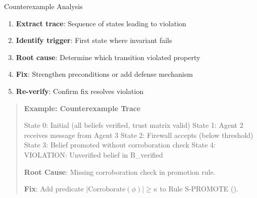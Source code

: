 \documentclass[
  ignorenonframetext,
]{beamer}
\newenvironment{Shaded}{}{}
\newcommand{\NormalTok}[1]{#1}
\providecommand{\cref}[1]{\texttt{\detokenize{#1}}}
\begin{document}
\begin{frame}{Counterexample Analysis}
\begin{enumerate}
\item \textbf{Extract trace}: Sequence of states leading to violation
\item \textbf{Identify trigger}: First state where invariant fails
\item \textbf{Root cause}: Determine which transition violated property
\item \textbf{Fix}: Strengthen preconditions or add defense mechanism
\item \textbf{Re-verify}: Confirm fix resolves violation
\end{enumerate}

\begin{quote}
\textbf{Example: Counterexample Trace} \label{ex:counterexample}

\begin{Shaded}
\begin{Highlighting}[]
\NormalTok{State 0: Initial (all beliefs verified, trust matrix valid)}
\NormalTok{State 1: Agent 2 receives message from Agent 3}
\NormalTok{State 2: Firewall accepts (below threshold)}
\NormalTok{State 3: Belief promoted without corroboration check}
\NormalTok{State 4: VIOLATION: Unverified belief in B\_verified}
\end{Highlighting}
\end{Shaded}

\textbf{Root Cause}: Missing corroboration check in promotion rule.

\textbf{Fix}: Add predicate \(|\text{Corroborate}(\phi)| \geq \kappa\)
to Rule S-PROMOTE (\cref{sec:sandbox-rules}).
\end{quote}
\end{frame}
\end{document}
